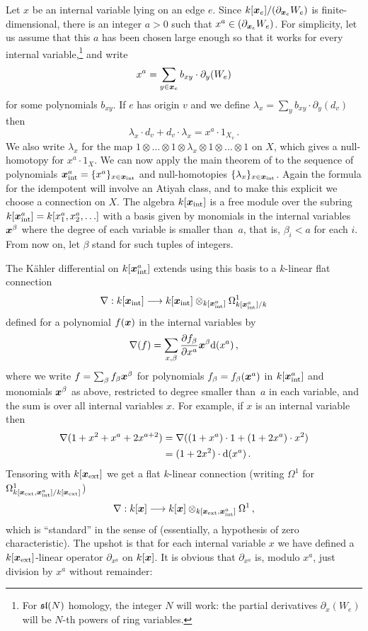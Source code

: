 \documentclass{compositio}
\theoremstyle{definition}
\numberwithin{equation}{section}
\begin{document}
Let $x$ be an internal variable lying on an edge $e$. Since $k[\boldsymbol{x}_e]/(\partial_{\boldsymbol{x}_e} W_e)$ is finite-dimensional, there is an integer $a > 0$ such that $x^a \in (\partial_{\boldsymbol{x}_e} W_e)$. For simplicity, let us assume that this $a$ has been chosen large enough so that it works for every internal variable,\footnote{For $\mathfrak{sl}(N)$ homology, the integer $N$ will work: the partial derivatives $\partial_x(W_e)$ will be $N$-th powers of ring variables.} and write
\[
x^a = \sum_{y \in \boldsymbol{x}_e} b_{xy} \cdot \partial_y(W_e)
\]
for some polynomials $b_{xy}$. If $e$ has origin $v$ and we define $\lambda_x = \sum_y b_{xy} \cdot \partial_y(d_v)$ then
\[
\lambda_x \cdot d_v + d_v \cdot \lambda_x = x^a \cdot 1_{X_v}\,.
\]
We also write $\lambda_x$ for the map $1 \otimes \ldots \otimes 1 \otimes\lambda_x \otimes 1\otimes \ldots \otimes 1$ on $X$, which gives a null-homotopy for $x^a \cdot 1_X$. We can now apply the main theorem of \cite{dm1102.2957} to the sequence of polynomials $\boldsymbol{x}_{\textup{int}}^a = \{ x^a \}_{x \in \boldsymbol{x}_{\textup{int}}}$ and null-homotopies $\{ \lambda_x \}_{x \in \boldsymbol{x}_{\textup{int}}}$. Again the formula for the idempotent will involve an Atiyah class, and to make this explicit we choose a connection on $X$. The algebra $k[\boldsymbol{x}_{\textup{int}}]$ is a free module over the subring $k[\boldsymbol{x}_{\textup{int}}^a] = k[x_1^a, x_2^a, \ldots]$ with a basis given by monomials in the internal variables $\boldsymbol{x}^\beta$ where the degree of each variable is smaller than~$a$, that is, $\beta_i < a$ for each $i$. From now on, let $\beta$ stand for such tuples of integers.

The K\"ahler differential on $k[\boldsymbol{x}_{\textup{int}}^a]$ extends using this basis to a $k$-linear flat connection
\[
\nabla: k[\boldsymbol{x}_{\textup{int}}] \longrightarrow k[\boldsymbol{x}_{\textup{int}}] \otimes_{k[\boldsymbol{x}_{\textup{int}}^a]} \Omega^1_{k[\boldsymbol{x}_{\textup{int}}^a]/k}
\]
defined for a polynomial $f(\boldsymbol{x})$ in the internal variables by
\[
\nabla(f) = \sum_{x, \beta} \frac{\partial f_\beta}{\partial x^a} \boldsymbol{x}^\beta \mathrm{d} (x^a)\,,
\]
where we write $f = \sum_\beta f_\beta \boldsymbol{x}^\beta$ for polynomials $f_\beta = f_\beta(\boldsymbol{x}^a)$ in $k[\boldsymbol{x}_{\textup{int}}^a]$ and monomials $\boldsymbol{x}^\beta$ as above, restricted to degree smaller than~$a$ in each variable, and the sum is over all internal variables $x$. For example, if $x$ is an internal variable then
\begin{align*}
\nabla( 1 + x^2 + x^a + 2x^{a+2} ) &= \nabla( (1 + x^a) \cdot 1 + (1 + 2x^a) \cdot x^2 )\\
&= (1 + 2x^2 ) \cdot \mathrm{d}(x^a)\,.
\end{align*}
Tensoring with $k[\boldsymbol{x}_{\textup{ext}}]$ we get a flat $k$-linear connection (writing $\Omega^1$ for $\Omega^1_{k[\boldsymbol{x}_{\textup{ext}},\boldsymbol{x}_{\textup{int}}^a]/k[\boldsymbol{x}_{\textup{ext}}]}$)
\[
\nabla: k[\boldsymbol{x}] \longrightarrow k[\boldsymbol{x}] \otimes_{k[\boldsymbol{x}_{\textup{ext}},\boldsymbol{x}_{\textup{int}}^a]} \Omega^1\,,
\]
which is ``standard'' in the sense of \cite[Section 8.1]{dm1102.2957} (essentially, a hypothesis of zero characteristic). The upshot is that for each internal variable $x$ we have defined a $k[\boldsymbol{x}_{\textup{ext}}]$-linear operator $\partial_{x^a}$ on $k[\boldsymbol{x}]$. It is obvious that $\partial_{x^a}$ is, modulo $x^a$, just division by $x^a$ without remainder:
\end{document}

